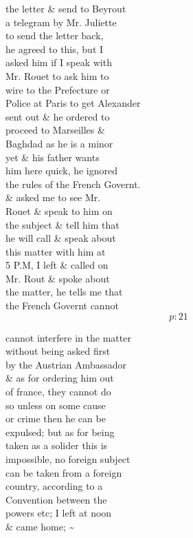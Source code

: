 \documentclass{report}
\begin{document}
	\par{
 	the letter \& send to Beyrout\ \\a telegram by Mr. Juliette\ \\to send the letter back,\ \\he agreed to this, but I\ \\asked him if I speak with\ \\Mr. Rouet to ask him to\ \\wire to the Prefecture or\ \\Police at Paris to get Alexander\ \\sent out \& he ordered to\ \\proceed to Marseilles \&\ \\Baghdad as he is a minor\ \\yet \& his father wants\ \\him here quick, he ignored\ \\the rules of the French Governt.\ \\\& asked me to see Mr.\ \\Rouet \& speak to him on\ \\the subject \& tell him that\ \\he will call \& speak about\ \\this matter with him at\ \\5 P.M, I left \& called on\ \\Mr. Rout \& spoke about\ \\the matter, he tells me that\ \\the French Governt cannot\ \\
  \[p: 21 \]

	}



	\par{
 	cannot interfere in the matter\ \\without being asked first\ \\by the Austrian Ambassador\ \\\& as for ordering him out\ \\of france, they cannot do\ \\so unless on some cause\ \\or crime then he can be\ \\expulsed; but as for being\ \\taken as a solider this is\ \\impossible, no foreign subject\ \\can be taken from a foreign\ \\country, according to a\ \\Convention between the\ \\powers etc; I left at noon\ \\\& came home; \~{}\ \\
	}
\end{document}
